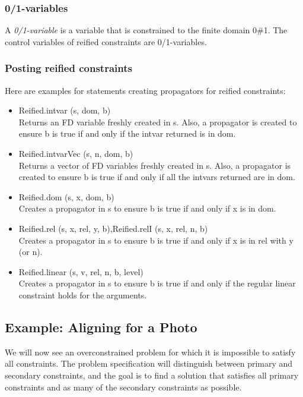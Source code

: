 \documentclass[a4paper]{scrartcl}
\begin{document}
\subsubsection{0/1-variables}
A {\it 0/1-variable} is a variable that is constrained to the finite 
domain 0$\#$1. The control variables of reified constraints are 0/1-variables. 

\subsubsection{Posting reified constraints}
Here are examples for statements creating propagators for 
reified constraints: 
\begin{itemize}
\item
Reified.intvar (s, dom, b)\\
Returns an FD variable freshly created in s. Also, a propagator 
is created to ensure b is true if and only if the intvar returned is in dom.
\item 
Reified.intvarVec (s, n, dom, b)\\
Returns a vector of FD variables freshly created in s. Also, a 
propagator is created to ensure b is true if and only if all the 
intvars returned are in dom. 
\item
Reified.dom (s, x, dom, b)\\
Creates a propagator in s to ensure b is true if and only if x is in dom. 
\item
Reified.rel (s, x, rel, y, b),Reified.relI (s, x, rel, n, b)\\
Creates a propagator in s to ensure b is true if and only if x 
is in rel with y (or n). 
\item
Reified.linear (s, v, rel, n, b, level)\\
Creates a propagator in s to ensure b is true if and only 
if the regular linear constraint holds for the arguments. 
\end{itemize}


\newpage
\subsection{Example: Aligning for a Photo}
\label{sec8-2}
We will now see an overconstrained problem for which it is impossible 
to satisfy all constraints. The problem specification will distinguish 
between primary and secondary constraints, and the goal is to find a 
solution that satisfies all primary constraints and as many of the 
secondary constraints as possible.
\end{document}
